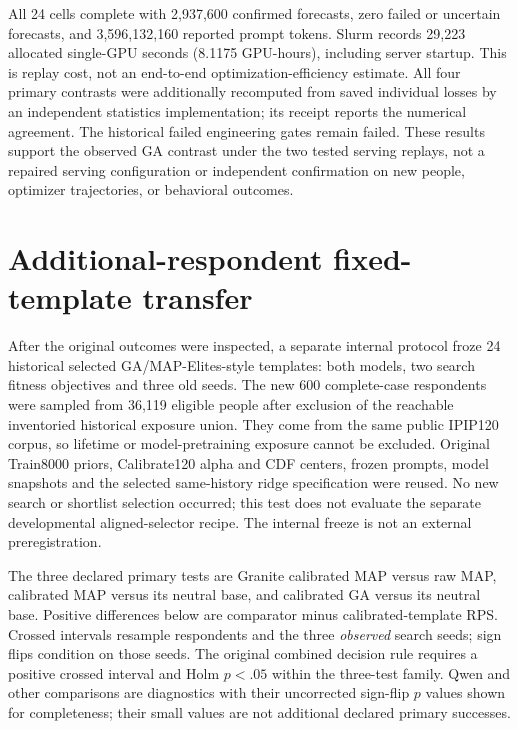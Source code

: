 \documentclass[sigconf,anonymous]{aamas}
\begin{document}
All 24 cells complete with 2,937,600 confirmed forecasts, zero failed or
uncertain forecasts, and 3,596,132,160 reported prompt tokens. Slurm records
29,223 allocated single-GPU seconds (8.1175 GPU-hours), including server startup.
This is replay cost, not an end-to-end optimization-efficiency estimate.
All four primary contrasts were additionally recomputed from saved individual
losses by an independent statistics implementation; its receipt reports the
numerical agreement. The historical failed engineering gates remain failed.
These results support the observed GA contrast under the two tested serving
replays, not a repaired serving configuration or independent confirmation on
new people, optimizer trajectories, or behavioral outcomes.

\section{Additional-respondent fixed-template transfer}\label{sec:transfer}
After the original outcomes were inspected, a separate internal protocol
froze 24 historical selected GA/MAP-Elites-style templates: both models, two
search fitness objectives and three old seeds. The new 600 complete-case
respondents were sampled from 36,119 eligible people after exclusion of the
reachable inventoried historical exposure union. They come from the same
public IPIP120 corpus, so lifetime or model-pretraining exposure cannot be
excluded. Original Train8000 priors, Calibrate120 alpha and CDF centers,
frozen prompts, model snapshots and the selected same-history ridge
specification were reused. No new search or shortlist selection occurred;
this test does not evaluate the separate developmental aligned-selector
recipe. The internal freeze is not an external preregistration.

The three declared primary tests are Granite calibrated MAP versus raw MAP,
calibrated MAP versus its neutral base, and calibrated GA versus its neutral
base. Positive differences below are comparator minus calibrated-template
RPS. Crossed intervals resample respondents and the three \emph{observed}
search seeds; sign flips condition on those seeds. The original combined
decision rule requires a positive crossed interval and Holm $p<.05$ within
the three-test family. Qwen and other comparisons are diagnostics with their
uncorrected sign-flip $p$ values shown for completeness; their small values
are not additional declared primary successes.
\end{document}
